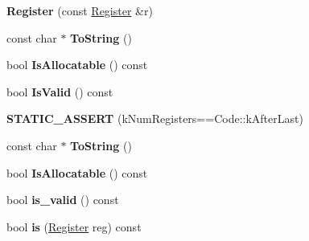 \begin{DoxyCompactItemize}
\item 
{\bfseries Register} (const \hyperlink{structv8_1_1internal_1_1_register}{Register} \&r)\hypertarget{structv8_1_1internal_1_1_register_a5f87013bafb0768409afcfa746a7f037}{}\label{structv8_1_1internal_1_1_register_a5f87013bafb0768409afcfa746a7f037}

\item 
const char $\ast$ {\bfseries To\+String} ()\hypertarget{structv8_1_1internal_1_1_register_a254d2d27c4eac468757026fa0db32bc7}{}\label{structv8_1_1internal_1_1_register_a254d2d27c4eac468757026fa0db32bc7}

\item 
bool {\bfseries Is\+Allocatable} () const \hypertarget{structv8_1_1internal_1_1_register_aff3395dd61f863c1c0685eeba73bff61}{}\label{structv8_1_1internal_1_1_register_aff3395dd61f863c1c0685eeba73bff61}

\item 
bool {\bfseries Is\+Valid} () const \hypertarget{structv8_1_1internal_1_1_register_a2e5ca1d03a075bb2e571c631b9e40d1a}{}\label{structv8_1_1internal_1_1_register_a2e5ca1d03a075bb2e571c631b9e40d1a}

\item 
{\bfseries S\+T\+A\+T\+I\+C\+\_\+\+A\+S\+S\+E\+RT} (k\+Num\+Registers==Code\+::k\+After\+Last)\hypertarget{structv8_1_1internal_1_1_register_a53a23ca06dff3559b5ac0756c287a14c}{}\label{structv8_1_1internal_1_1_register_a53a23ca06dff3559b5ac0756c287a14c}

\item 
const char $\ast$ {\bfseries To\+String} ()\hypertarget{structv8_1_1internal_1_1_register_a254d2d27c4eac468757026fa0db32bc7}{}\label{structv8_1_1internal_1_1_register_a254d2d27c4eac468757026fa0db32bc7}

\item 
bool {\bfseries Is\+Allocatable} () const \hypertarget{structv8_1_1internal_1_1_register_aff3395dd61f863c1c0685eeba73bff61}{}\label{structv8_1_1internal_1_1_register_aff3395dd61f863c1c0685eeba73bff61}

\item 
bool {\bfseries is\+\_\+valid} () const \hypertarget{structv8_1_1internal_1_1_register_aeba40cdab1c80791a6d5f93a83306c14}{}\label{structv8_1_1internal_1_1_register_aeba40cdab1c80791a6d5f93a83306c14}

\item 
bool {\bfseries is} (\hyperlink{structv8_1_1internal_1_1_register}{Register} reg) const \hypertarget{structv8_1_1internal_1_1_register_aa402e2b93681b3bf2fe5ffde8d198f0e}{}\label{structv8_1_1internal_1_1_register_aa402e2b93681b3bf2fe5ffde8d198f0e}


\end{DoxyCompactItemize}
